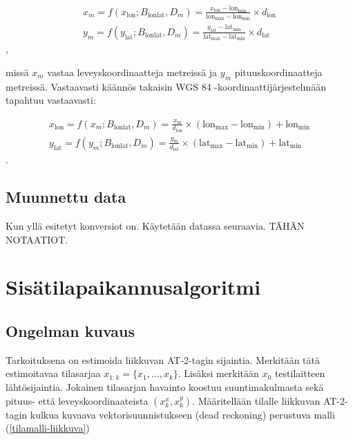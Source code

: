 \documentclass[
  12pt,
  a4paper, twoside]{book}
\begin{document}
\begin{align}\label{wgs84-m}
x_m = f(x_{\text{lon}}; B_{\text{lonlat}}, D_m) = \frac{x_{\text{lon}} -\text{lon}_{\text{min}}}{\text{lon}_{\text{max}}-\text{lon}_{\text{min}}} \times d_{\text{lon}}   \\
y_m = f(y_{\text{lat}}; B_{\text{lonlat}}, D_m) = \frac{y_{\text{lat}} -\text{lat}_{\text{min}}}{\text{lat}_{\text{max}}-\text{lat}_{\text{min}}} \times d_{\text{lat}}
\end{align},

missä \(x_m\) vastaa leveyskoordinaatteja metreissä ja \(y_m\) pituuskoordinaatteja metreissä. Vastaavasti käännös takaisin WGS 84 -koordinaattijärjestelmään tapahtuu vastaavasti:

\begin{align}\label{m-wgs84}
x_{\text{lon}} = f(x_m; B_{\text{lonlat}}, D_m) = \frac{x_{\text{m}}}{d_{\text{lon}}} \times (\text{lon}_{\text{max}}-\text{lon}_{\text{min}}) + \text{lon}_{\text{min}} \\
y_{\text{lat}} = f(y_m; B_{\text{lonlat}}, D_m) = \frac{y_{\text{m}}}{d_{\text{lat}}} \times (\text{lat}_{\text{max}}-\text{lat}_{\text{min}}) + \text{lat}_{\text{min}}
\end{align}.

\subsection{Muunnettu data}

Kun yllä esitetyt konversiot on. Käytetään datassa seuraavia. TÄHÄN NOTAATIOT.

\section{Sisätilapaikannusalgoritmi}

\subsection{Ongelman kuvaus}

Tarkoituksena on estimoida liikkuvan AT-2-tagin sijaintia. Merkitään tätä estimoitavaa tilasarjaa \(x_{1:k}=\{x_1,\ldots,x_k\}\). Lisäksi merkitään \(x_0\) testilaitteen lähtösijaintia. Jokainen tilasarjan havainto koostuu suuntimakulmasta sekä pituus- että leveyskoordinaateista \((x_k^x, x_k^y)\). Määritellään tilalle liikkuvan AT-2-tagin kulkua kuvaava vektorisuunnistukseen (dead reckoning) perustuva malli (\ref{tilamalli-liikkuva})
\end{document}
